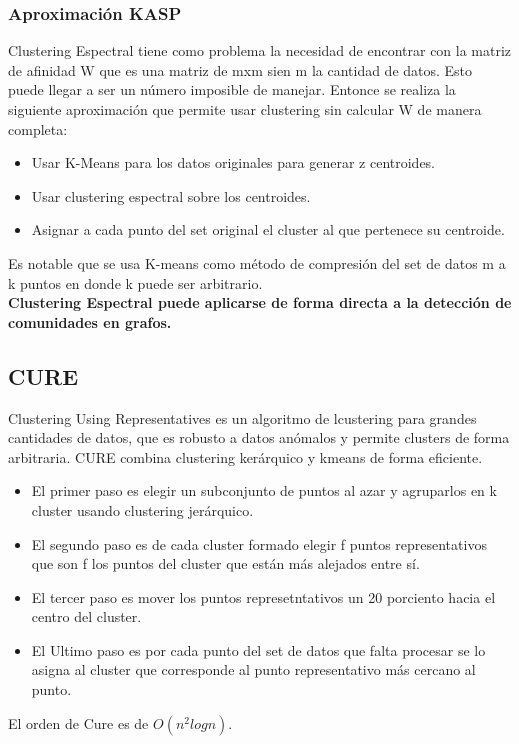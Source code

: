 \documentclass[titlepage,a4paper]{article}
\begin{document}
\subsubsection*{Aproximación KASP}
Clustering Espectral tiene como problema la necesidad de encontrar con la matriz de afinidad W que es una matriz de mxm sien m la cantidad de datos. Esto puede llegar a ser un número imposible de manejar. Entonce se realiza la siguiente aproximación que permite usar clustering sin calcular W de manera completa: 
\begin{itemize}
\item Usar K-Means para los datos originales para generar z centroides. 
\item Usar clustering espectral sobre los centroides. 
\item Asignar a cada punto del set original el cluster al que pertenece su centroide. 
\end{itemize}
Es notable que se usa K-means como método de compresión del set de datos m a k puntos en donde k puede ser arbitrario. \\

\textbf{Clustering Espectral puede aplicarse de forma directa a la detección de comunidades en grafos. }

\subsection*{CURE} 
Clustering Using Representatives es un algoritmo de lcustering para grandes cantidades de datos, que es robusto a datos anómalos y permite clusters de forma arbitraria. CURE combina clustering kerárquico y kmeans de forma eficiente. 
\begin{itemize}
\item El primer paso es elegir un subconjunto de puntos al azar y agruparlos en k cluster usando clustering jerárquico. 
\item El segundo paso es de cada cluster formado elegir f puntos representativos que son f los puntos del cluster que están más alejados entre sí. 
\item  El tercer paso es mover los puntos represetntativos un 20 porciento hacia el centro del cluster. 
\item El Ultimo paso es por cada punto del set de datos que falta procesar se lo asigna al cluster que corresponde al punto representativo más cercano al punto. 
\end{itemize}
El orden de Cure es de $O(n^2 log n)$.
\end{document}
